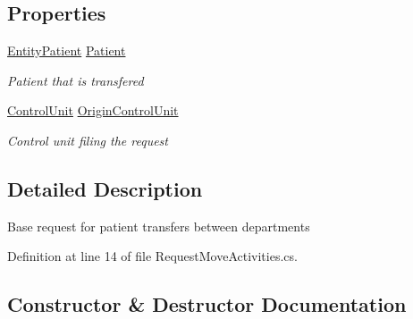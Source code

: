 \subsection*{Properties}
\begin{DoxyCompactItemize}
\item 
\hyperlink{class_general_health_care_elements_1_1_entities_1_1_entity_patient}{Entity\+Patient} \hyperlink{class_general_health_care_elements_1_1_management_1_1_request_move_patient_activities_a9f9dd7f3fb05c9b73d420d1136c4d4fa}{Patient}
\begin{DoxyCompactList}\small\item\em Patient that is transfered \end{DoxyCompactList}\item 
\hyperlink{class_simulation_core_1_1_h_c_c_m_elements_1_1_control_unit}{Control\+Unit} \hyperlink{class_general_health_care_elements_1_1_management_1_1_request_move_patient_activities_a3c0dba8373877b6a023e3433712f112c}{Origin\+Control\+Unit}
\begin{DoxyCompactList}\small\item\em Control unit filing the request \end{DoxyCompactList}\end{DoxyCompactItemize}


\subsection{Detailed Description}
Base request for patient transfers between departments 



Definition at line 14 of file Request\+Move\+Activities.\+cs.



\subsection{Constructor \& Destructor Documentation}
